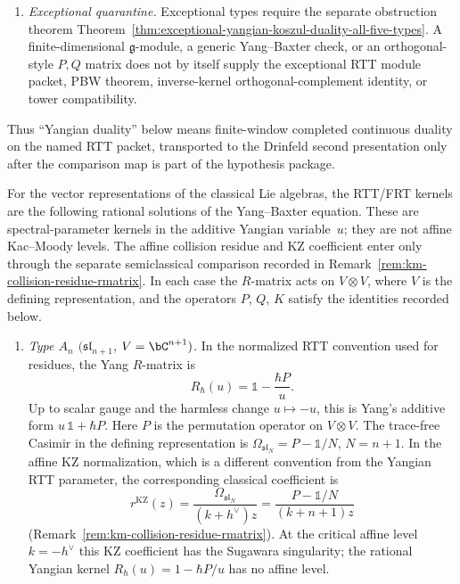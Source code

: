 \begin{proposition}
\begin{enumerate}[label=\textup{(\roman*)}]
\item \emph{Exceptional quarantine.}
 Exceptional types require the separate obstruction theorem
 Theorem~\ref{thm:exceptional-yangian-koszul-duality-all-five-types}.
 A finite-dimensional $\mathfrak g$-module, a generic Yang--Baxter
 check, or an orthogonal-style $P,Q$ matrix does not by itself supply
 the exceptional RTT module packet, PBW theorem, inverse-kernel
 orthogonal-complement identity, or tower compatibility.
\end{enumerate}
Thus ``Yangian duality'' below means finite-window completed
continuous duality on the named RTT packet, transported to the
Drinfeld second presentation only after the comparison map is part of
the hypothesis package.
\end{proposition}

\begin{theorem}
\label{thm:rtt-all-classical-types}
For the vector representations of the classical Lie algebras, the
RTT/FRT kernels are the following rational solutions of the
Yang--Baxter equation.  These are spectral-parameter kernels in the
additive Yangian variable~$u$; they are not affine Kac--Moody levels.
The affine collision residue and KZ coefficient enter only through
the separate semiclassical comparison recorded in
Remark~\ref{rem:km-collision-residue-rmatrix}.  In each case the
$R$-matrix acts on $V\otimes V$, where $V$ is the defining
representation, and the operators $P$, $Q$, $K$ satisfy the identities
recorded below.
\begin{enumerate}[label=\textup{(\roman*)}]
\item \emph{Type $A_n$ $(\mathfrak{sl}_{n+1}$, $V = \bC^{n+1})$.}
 In the normalized RTT convention used for residues, the Yang
 $R$-matrix is
 \begin{equation}\label{eq:rmatrix-type-a}
 R_\hbar(u)=\mathbb{1}-\frac{\hbar P}{u}.
 \end{equation}
 Up to scalar gauge and the harmless change $u\mapsto -u$, this is
 Yang's additive form $u\,\mathbb{1}+ \hbar P$. Here $P$ is the
 permutation operator on $V \otimes V$.
 The trace-free Casimir in the defining representation is
 $\Omega_{\mathfrak{sl}_N}=P-\mathbb{1}/N$, $N=n+1$.  In the
 affine KZ normalization, which is a different convention from the
 Yangian RTT parameter, the corresponding classical coefficient is
 \[
 r^{\mathrm{KZ}}(z)
 =\frac{\Omega_{\mathfrak{sl}_N}}{(k+h^\vee)z}
 =\frac{P-\mathbb{1}/N}{(k+n+1)z}
 \]
 (Remark~\ref{rem:km-collision-residue-rmatrix}).  At the critical
 affine level $k=-h^\vee$ this KZ coefficient has the Sugawara
 singularity; the rational Yangian kernel
 $R_\hbar(u)=1-\hbar P/u$ has no affine level.


\end{enumerate}
\end{theorem}
